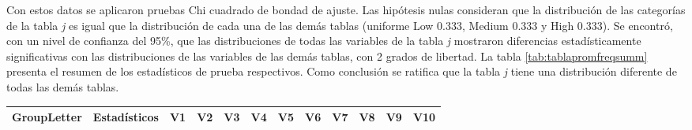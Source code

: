 \documentclass[mathematics,article,submit,moreauthors,pdftex]{mdpi}
\begin{document}
Con estos datos se aplicaron pruebas Chi cuadrado de bondad de ajuste.
Las hipótesis nulas consideran que la distribución de las categorías de
la tabla \emph{j} es igual que la distribución de cada una de las demás
tablas (uniforme Low 0.333, Medium 0.333 y High 0.333). Se encontró, con
un nivel de confianza del 95\%, que las distribuciones de todas las
variables de la tabla \emph{j} mostraron diferencias estadísticamente
significativas con las distribuciones de las variables de las demás
tablas, con 2 grados de libertad. La tabla \ref{tab:tablapromfreqsumm}
presenta el resumen de los estadísticos de prueba respectivos. Como
conclusión se ratifica que la tabla \emph{j} tiene una distribución
diferente de todas las demás tablas.

\begin{table}[H]
\centering
\begin{tabular}{llrrrrrrrrrr}
\toprule
\multicolumn{1}{c}{\textbf{GroupLetter}} & \multicolumn{1}{c}{\textbf{Estadísticos}} & \multicolumn{1}{c}{\textbf{V1}}      & \multicolumn{1}{c}{\textbf{V2}}      & \multicolumn{1}{c}{\textbf{V3}}      & \multicolumn{1}{c}{\textbf{V4}}      & \multicolumn{1}{c}{\textbf{V5}}      & \multicolumn{1}{c}{\textbf{V6}}      & \multicolumn{1}{c}{\textbf{V7}}      & \multicolumn{1}{c}{\textbf{V8}}      & \multicolumn{1}{c}{\textbf{V9}}      & \multicolumn{1}{c}{\textbf{V10}}     \\ \midrule


\end{tabular}
\end{table}
\end{document}
